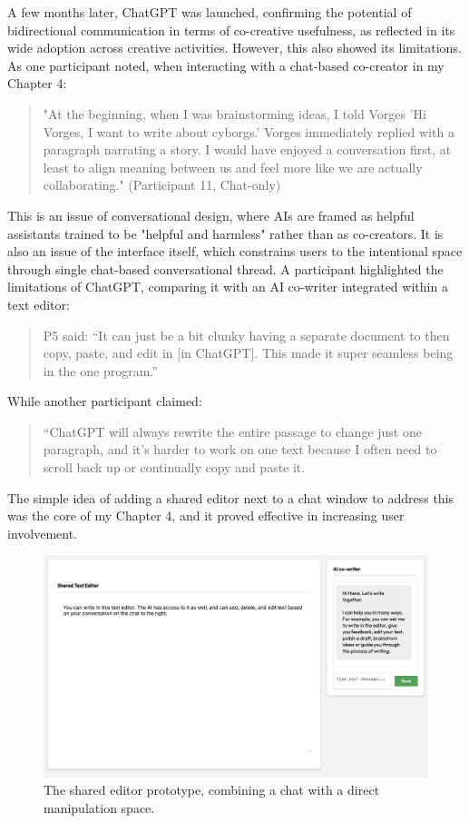 A few months later, ChatGPT was launched, confirming the potential of bidirectional communication in terms of co-creative usefulness, as reflected in its wide adoption across creative activities. However, this also showed its limitations. As one participant noted, when interacting with a chat-based co-creator in my Chapter 4:
\begin{quote}
"At the beginning, when I was brainstorming ideas, I told Vorges ’Hi Vorges, I want to write about cyborgs.’ Vorges immediately replied with a paragraph narrating a story. I would have enjoyed a conversation first, at least to align meaning between us and feel more like we are actually collaborating." (Participant 11, Chat-only)
\end{quote}
This is an issue of conversational design, where AIs are framed as helpful assistants trained to be "helpful and harmless" \cite{Bai2022-ec, Ouyang2022-af} rather than as co-creators. It is also an issue of the interface itself, which constrains users to the intentional space through single chat-based conversational thread. A participant highlighted the limitations of ChatGPT, comparing it with an AI co-writer integrated within a text editor:
\begin{quote}
P5 said: “It can just be a bit clunky having a separate document to then copy, paste, and edit in [in ChatGPT]. This made it super seamless being in the one program.”
\end{quote}

While another participant claimed:

\begin{quote}
“ChatGPT will always rewrite the entire passage to change just one paragraph, and it’s harder to work on one text because I often need to scroll back up or continually copy and paste it.
\end{quote}

The simple idea of adding a shared editor next to a chat window to address this was the core of my Chapter 4, and it proved effective in increasing user involvement.
\begin{figure}[H]
    \centering
    \includegraphics[width=1\linewidth]{sharededitor.png}
    \caption{The shared editor prototype, combining a chat with a direct manipulation space.}
    \label{fig:shared-editor}
\end{figure}


